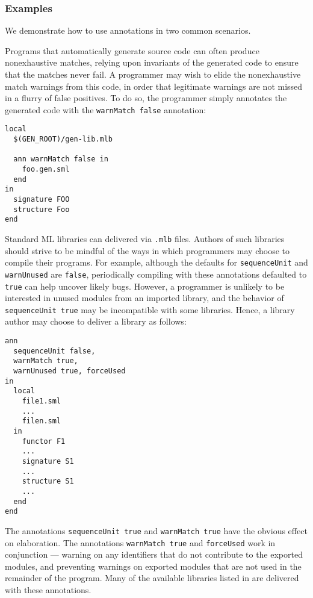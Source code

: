 %
\subsubsection{Examples}

We demonstrate how to use annotations in two common scenarios.

Programs that automatically generate source code can often produce
nonexhaustive matches, relying upon invariants of the generated code
to ensure that the matches never fail.  A programmer may wish to elide
the nonexhaustive match warnings from this code, in order that
legitimate warnings are not missed in a flurry of false positives.  To
do so, the programmer simply annotates the generated code with the
{\tt warnMatch false} annotation:
\begin{verbatim}
local
  $(GEN_ROOT)/gen-lib.mlb

  ann warnMatch false in
    foo.gen.sml
  end
in
  signature FOO
  structure Foo
end
\end{verbatim}

Standard ML libraries can delivered via {\tt .mlb} files.  Authors of
such libraries should strive to be mindful of the ways in which
programmers may choose to compile their programs.  For example,
although the defaults for {\tt sequenceUnit} and {\tt warnUnused} are
{\tt false}, periodically compiling with these annotations defaulted
to {\tt true} can help uncover likely bugs.  However, a programmer is
unlikely to be interested in unused modules from an imported library,
and the behavior of {\tt sequenceUnit true} may be incompatible with
some libraries.  Hence, a library author may choose to deliver a
library as follows:
\begin{verbatim}
ann 
  sequenceUnit false,
  warnMatch true,
  warnUnused true, forceUsed
in
  local
    file1.sml
    ...
    filen.sml
  in
    functor F1
    ...
    signature S1
    ...
    structure S1
    ...
  end
end
\end{verbatim}
The annotations {\tt sequenceUnit true} and {\tt warnMatch true} have
the obvious effect on elaboration.  The annotations {\tt warnMatch
true} and {\tt forceUsed} work in conjunction --- warning on any
identifiers that do not contribute to the exported modules, and
preventing warnings on exported modules that are not used in the
remainder of the program.  Many of the available libraries listed in
 are delivered with these annotations.
